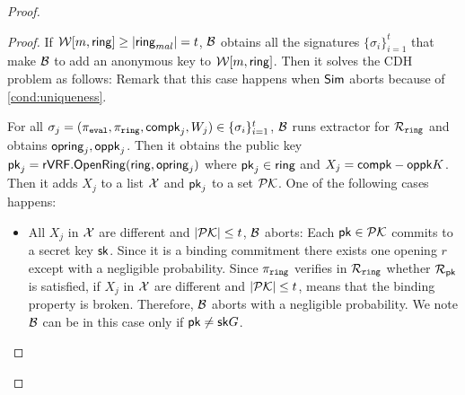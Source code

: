 \begin{proof}
\begin{proof}
			If $ \mathcal{W}[m,\mathsf{ring}] \geq |\mathsf{ring}_{mal}| =t$, $ \mathcal{B} $ obtains all the signatures $ \{\sigma_i\}_{i =1}^t $ that make $ \mathcal{B} $ to add an anonymous key to $ \mathcal{W}[m,\mathsf{ring}] $. Then it solves the CDH problem as follows: Remark that this case happens when $ \mathsf{Sim} $ aborts because of \ref{cond:uniqueness}.
			
			For all $ \sigma_j = (\pi_{\mathtt{eval}},\pi_{\mathtt{ring}},\mathsf{compk}_j,W_j) \in \{\sigma_i\}_{i =1}^t $, $ \mathcal{B} $ runs extractor for $ \mathcal{R}_{\mathtt{ring}} $ and obtains $\mathsf{opring}_j, \mathsf{oppk}_j$. Then it obtains the public key $ \mathsf{pk}_j = {\mathsf{rVRF}}.{\mathsf{OpenRing}}(\mathsf{ring}, \mathsf{opring}_j) $ where $ \mathsf{pk}_j \in \mathsf{ring} $ and  $ X_j = \mathsf{compk}- \mathsf{oppk} K $. Then it adds $ X_j $ to a list $ {\mathcal{X}}  $ and $ \mathsf{pk}_j $ to a set $ {\mathcal{PK}} $. One of the following cases happens:
			
			\begin{itemize}
				
			\item All $ X_j $ in $ {\mathcal{X}} $ are different and $ |{\mathcal{PK}}| \leq t $, $ \mathcal{B} $ aborts: Each $ \mathsf{pk} \in {\ensuremath{\mathcal{PK}}} $ commits to a secret key $ \mathsf{sk} $. Since it is a binding commitment there exists one opening $ r $ except with a negligible probability. Since $ \pi_{\mathtt{ring}} $ verifies in $ \mathcal{R}_{\mathtt{ring}} $ whether $ \mathcal{R}_{\mathsf{pk}} $ is satisfied, if  $ X_j $ in $ {\mathcal{X}} $ are different and $ |{\mathcal{PK}}| \leq t $, means that the binding property is broken. Therefore, $ \mathcal{B}  $ aborts with a negligible probability. We note $ \mathcal{B} $ can be in this case only if $ \mathsf{pk} \neq \mathsf{sk} G $.
			

\end{itemize}
\end{proof}
\end{proof}
